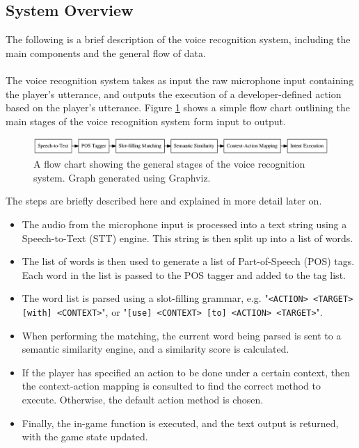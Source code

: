 \documentclass[12pt]{article}
\begin{document}
\subsection{System Overview}

The following is a brief description of the voice recognition system, including the main components and the general flow of data.
\\
\\
The voice recognition system takes as input the raw microphone input containing the player's utterance, and outputs the execution of a developer-defined action based on the player's utterance. Figure \ref{fig:flow-chart} shows a simple flow chart outlining the main stages of the voice recognition system form input to output.

\begin{center}
\begin{figure}[H]
\begin{center}
  \includegraphics[width=\linewidth]{flow-chart.png}
  \caption{A flow chart showing the general stages of the voice recognition system. Graph generated using Graphviz.}
  \label{fig:flow-chart}
  \end{center}
\end{figure}
\end{center}

The steps are briefly described here and explained in more detail later on.

\begin{itemize}
\item The audio from the microphone input is processed into a text string using a Speech-to-Text (STT) engine. This string is then split up into a list of words.

\item The list of words is then used to generate a list of Part-of-Speech (POS) tags. Each word in the list is passed to the POS tagger and added to the tag list.

\item The word list is parsed using a slot-filling grammar, e.g. "\texttt{<ACTION> <TARGET> [with] <CONTEXT>}", or "\texttt{[use] <CONTEXT> [to] <ACTION> <TARGET>}".

\item When performing the matching, the current word being parsed is sent to a semantic similarity engine, and a similarity score is calculated.

\item If the player has specified an action to be done under a certain context, then the context-action mapping is consulted to find the correct method to execute. Otherwise, the default action method is chosen.

\item Finally, the in-game function is executed, and the text output is returned, with the game state updated.
\end{itemize}
\end{document}
